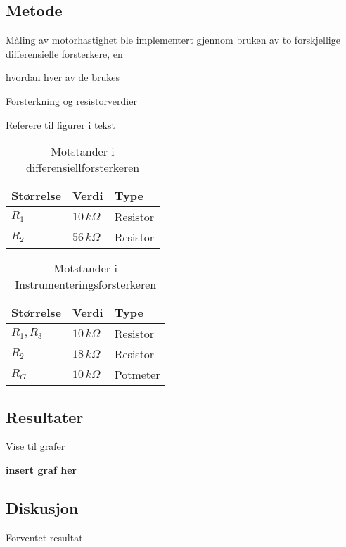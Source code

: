 \subsection{Metode}
Måling av motorhastighet ble implementert gjennom bruken av to forskjellige differensielle forsterkere, en 

hvordan hver av de brukes

Forsterkning og resistorverdier

Referere til figurer i tekst



\begin{table}[h]
	\centering
    \caption{Motstander i differensiellforsterkeren}
	\begin{tabular}{lll}
		\toprule
		Størrelse & Verdi & Type \\
		\midrule
        $R_1$ & $10\,k\Omega$& Resistor \\
        $R_2$ & $56\,k\Omega$ & Resistor\\
		\bottomrule
	\end{tabular}
\label{tab:eksempeltabell}
\end{table}


\begin{table}[h]
	\centering
    \caption{Motstander i Instrumenteringsforsterkeren}
	\begin{tabular}{lll}
		\toprule
		Størrelse & Verdi & Type \\
		\midrule
        $R_1, R_3$ & $10\,k\Omega$& Resistor \\
        $R_2$ & $18\,k\Omega$ & Resistor\\
        $R_G$ & $10\,k\Omega$ & Potmeter\\
		\bottomrule
	\end{tabular}
    
\label{tab:eksempeltabell}
\end{table}

\subsection{Resultater}
Vise til grafer

\textbf{insert graf her}



\subsection{Diskusjon}

Forventet resultat

